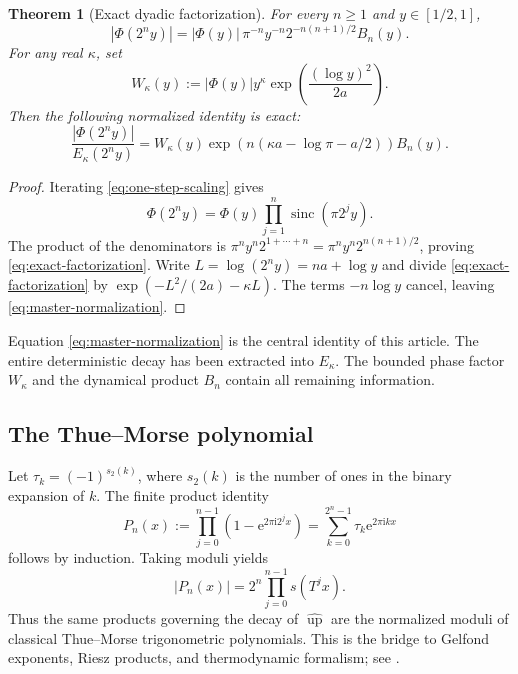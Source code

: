 \documentclass[11pt,oneside]{article}
\newtheorem{theorem}{Theorem}[section]
\theoremstyle{definition}
\theoremstyle{remark}
\newcommand{\e}{\mathrm e}
\newcommand{\ii}{\mathrm i}
\newcommand{\Up}{\operatorname{up}}
\newcommand{\sinc}{\operatorname{sinc}}
\newcommand{\Phiup}{\Phi}
\newcommand{\abs}[1]{\left|#1\right|}
\begin{document}
\begin{theorem}[Exact dyadic factorization]
\label{thm:exact-dyadic-factorization}
For every $n\ge1$ and $y\in[1/2,1]$,
\begin{equation}
 \abs{\Phiup(2^n y)}
 =\abs{\Phiup(y)}\,\pi^{-n}y^{-n}2^{-n(n+1)/2}B_n(y).
 \label{eq:exact-factorization}
\end{equation}
For any real $\kappa$, set
\begin{equation}
 W_\kappa(y)
 :=\abs{\Phiup(y)}y^\kappa
   \exp\!\left(\frac{(\log y)^2}{2a}\right).
 \label{eq:W-kappa}
\end{equation}
Then the following normalized identity is exact:
\begin{equation}
 \frac{\abs{\Phiup(2^n y)}}{E_\kappa(2^n y)}
 =W_\kappa(y)
  \exp\!\left(n(\kappa a-\log\pi-a/2)\right)B_n(y).
 \label{eq:master-normalization}
\end{equation}
\end{theorem}

\begin{proof}
Iterating \eqref{eq:one-step-scaling} gives
\[
 \Phiup(2^n y)=\Phiup(y)\prod_{j=1}^{n}\sinc(\pi2^j y).
\]
The product of the denominators is
$\pi^ny^n2^{1+\cdots+n}=\pi^ny^n2^{n(n+1)/2}$, proving
\eqref{eq:exact-factorization}.  Write $L=\log(2^ny)=na+\log y$ and divide
\eqref{eq:exact-factorization} by
$\exp(-L^2/(2a)-\kappa L)$.  The terms $-n\log y$ cancel, leaving
\eqref{eq:master-normalization}.
\end{proof}

Equation \eqref{eq:master-normalization} is the central identity of this article.  The
entire deterministic decay has been extracted into $E_\kappa$.  The bounded phase factor
$W_\kappa$ and the dynamical product $B_n$ contain all remaining information.

\subsection{The Thue--Morse polynomial}

Let $\tau_k=(-1)^{s_2(k)}$, where $s_2(k)$ is the number of ones in the binary expansion of
$k$.  The finite product identity
\begin{equation}
 P_n(x):=\prod_{j=0}^{n-1}(1-\e^{2\pi\ii2^jx})
 =\sum_{k=0}^{2^n-1}\tau_k\e^{2\pi\ii kx}
 \label{eq:TM-polynomial}
\end{equation}
follows by induction.  Taking moduli yields
\begin{equation}
 \abs{P_n(x)}=2^n\prod_{j=0}^{n-1}s(T^jx).
 \label{eq:TM-modulus}
\end{equation}
Thus the same products governing the decay of $\widehat{\Up}$ are the normalized moduli of
classical Thue--Morse trigonometric polynomials.  This is the bridge to Gelfond exponents,
Riesz products, and thermodynamic formalism; see \cite{gelfond,queffelec,fan-schmeling-shen}.
\end{document}
